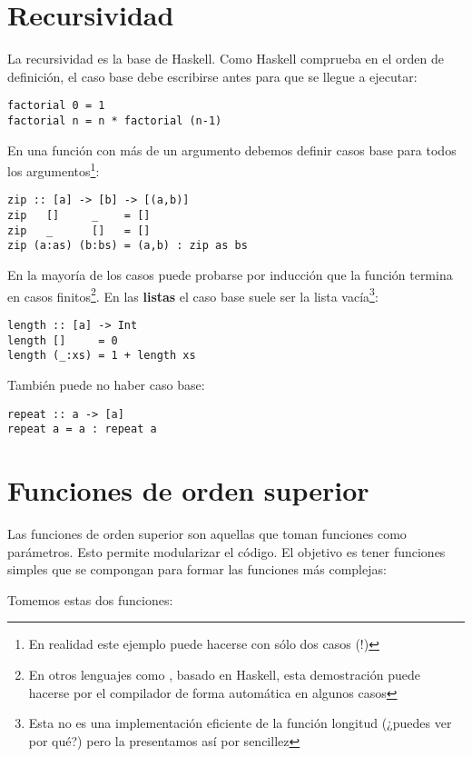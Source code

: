 \section{Recursividad}

La recursividad es la base de Haskell. Como Haskell comprueba en el orden de
definición, el caso base debe escribirse antes para que se llegue a ejecutar:

\begin{lstlisting}
factorial 0 = 1
factorial n = n * factorial (n-1)
\end{lstlisting}

En una función con más de un argumento debemos definir casos base para todos los
argumentos\footnote{En realidad este ejemplo puede hacerse con sólo dos casos (!)}:

\begin{lstlisting}
zip :: [a] -> [b] -> [(a,b)]
zip   []     _    = []
zip   _      []   = []
zip (a:as) (b:bs) = (a,b) : zip as bs
\end{lstlisting}

En la mayoría de los casos puede probarse por inducción que la función termina
en casos finitos\footnote{En otros lenguajes como , basado en Haskell, esta demostración puede hacerse por el compilador de forma automática en algunos casos}. En las \textbf{listas} el caso base suele ser la lista vacía\footnote{Esta no es una implementación eficiente de la función longitud (¿puedes ver por qué?) pero la presentamos así por sencillez}:

\begin{lstlisting}
length :: [a] -> Int
length []     = 0
length (_:xs) = 1 + length xs
\end{lstlisting}

También puede no haber caso base:

\begin{lstlisting}
repeat :: a -> [a]
repeat a = a : repeat a
\end{lstlisting}

\section{Funciones de orden superior}
Las funciones de orden superior son aquellas que toman funciones como parámetros.
Esto permite modularizar el código. El objetivo es tener funciones simples
que se compongan para formar las funciones más complejas:

Tomemos estas dos funciones:

